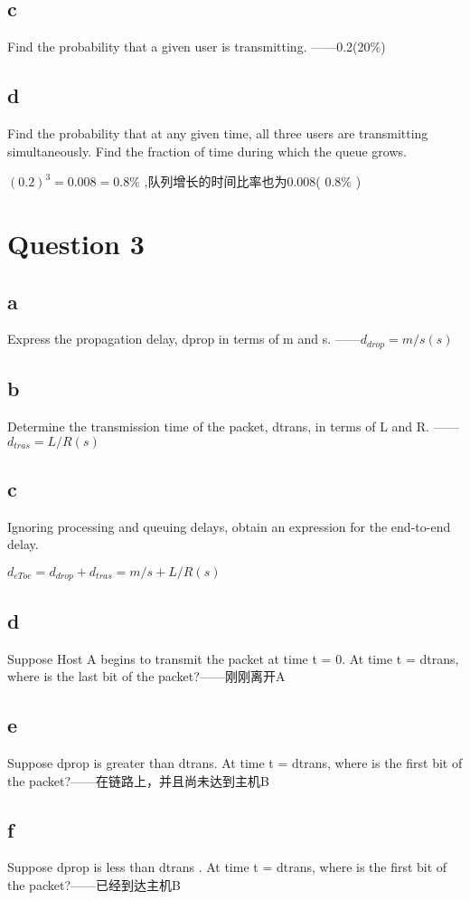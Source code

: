 \documentclass[UTF8]{article}
\begin{document}
\subsection*{c}
Find the probability that a given user is transmitting. ——0.2(20\%)
\subsection*{d}
Find the probability that at any given time, all three users are transmitting simultaneously. Find the fraction of time during which the queue grows.\par
$(0.2)^3= 0.008 = 0.8\%$ ,队列增长的时间比率也为0.008( $0.8\%$ )
\section*{Question 3}
\subsection*{a}
Express the propagation delay, dprop in terms of m and s. ——$d_{drop}=m/s(s)$
\subsection*{b}
Determine the transmission time of the packet, dtrans, in terms of L and R. ——$d_{tras}=L/R(s)$
\subsection*{c}
Ignoring processing and queuing delays, obtain an expression for the end-to-end delay. \par $d_{eToe}=d_{drop}+d_{tras}=m/s+L/R(s)$
\subsection*{d}
Suppose Host A begins to transmit the packet at time t = 0. At time t = dtrans, where is the last bit of the packet?——刚刚离开A
\subsection*{e}
Suppose dprop is greater than dtrans. At time t = dtrans, where is the first bit of the packet?——在链路上，并且尚未达到主机B
\subsection*{f}
Suppose dprop is less than dtrans . At time t = dtrans, where is the first bit of the packet?——已经到达主机B
\end{document}
